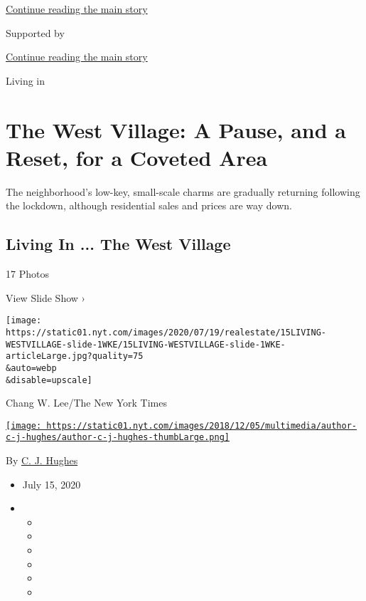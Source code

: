 \protect\hyperlink{after-top}{Continue reading the main story}

Supported by

\protect\hyperlink{after-sponsor}{Continue reading the main story}

Living in

\hypertarget{the-west-village-a-pause-and-a-reset-for-a-coveted-area}{%
\section{The West Village: A Pause, and a Reset, for a Coveted
Area}\label{the-west-village-a-pause-and-a-reset-for-a-coveted-area}}

The neighborhood's low-key, small-scale charms are gradually returning
following the lockdown, although residential sales and prices are way
down.

\href{https://www.nytimes.com/slideshow/2020/07/15/realestate/living-in-the-west-village.html}{}

\hypertarget{living-in--the-west-village}{%
\subsection{Living In ... The West
Village}\label{living-in--the-west-village}}

17 Photos

View Slide Show ›

\texttt{[image: https://static01.nyt.com/images/2020/07/19/realestate/15LIVING-WESTVILLAGE-slide-1WKE/15LIVING-WESTVILLAGE-slide-1WKE-articleLarge.jpg?quality=75\\\&auto=webp\\\&disable=upscale]}

Chang W. Lee/The New York Times

\href{https://www.nytimes.com/by/c-j-hughes}{\texttt{[image: https://static01.nyt.com/images/2018/12/05/multimedia/author-c-j-hughes/author-c-j-hughes-thumbLarge.png]}}

By \href{https://www.nytimes.com/by/c-j-hughes}{C. J. Hughes}

\begin{itemize}
\item
  July 15, 2020
\item
  \begin{itemize}
  \item
  \item
  \item
  \item
  \item
  \item
  \end{itemize}
\end{itemize}

